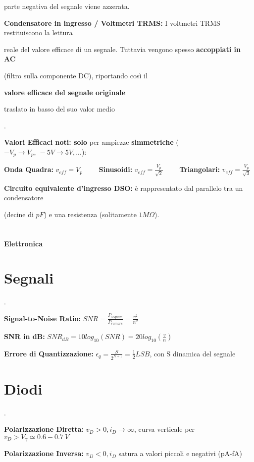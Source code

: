 \documentclass[12pt]{extarticle}
\begin{document}
parte negativa del segnale viene azzerata.
\newpage

{\bf Condensatore in ingresso / Voltmetri TRMS:} I voltmetri TRMS restituiscono la lettura

reale del valore efficace di un segnale. Tuttavia vengono spesso {\bf accoppiati in AC} 

(filtro sulla componente DC), riportando così il {\bf valore efficace del segnale originale

traslato in basso del suo valor medio}.

{\bf Valori Efficaci noti: solo} per ampiezze {\bf simmetriche} ($-V_p \to V_p, \ -5V \to 5V, ...$):

{\bf Onda Quadra:} $\displaystyle v_{eff} = V_p$ \ \ \ \ {\bf Sinusoidi:} $\displaystyle v_{eff} = \frac{V_p}{\sqrt{2}}$ \ \ \ \ {\bf Triangolari:} $\displaystyle v_{eff} = \frac{V_p}{\sqrt{3}}$


{\bf Circuito equivalente d'ingresso DSO:} è rappresentato dal parallelo tra un condensatore

(decine di $\displaystyle pF $) e una resistenza (solitamente $\displaystyle 1M\Omega $).
\\\\\\

{\bf \Huge Elettronica}
\setcounter{section}{0}
\section{Segnali}.



{\bf Signal-to-Noise Ratio:} $\displaystyle SNR = \frac{P_{segnale}}{P_{rumore}} = \frac{v^2}{n^2}$ 

{\bf SNR in dB:} $\displaystyle SNR_{dB} = 10log_{10}(SNR) = 20log_{10}(\frac{v}{n})$

{\bf Errore di Quantizzazione:} $\displaystyle \epsilon_q = \frac{S}{2^{N+1}} = \frac{1}{2}LSB $, con S dinamica del segnale

\section{Diodi}.

{\bf Polarizzazione Diretta:} $\displaystyle v_D > 0, i_D \to \infty $, curva verticale per $v_D > V_\gamma \simeq 0.6-0.7 \ V$

{\bf Polarizzazione Inversa:} $\displaystyle v_D < 0, i_D$ satura a valori piccoli e negativi (pA-fA)
\end{document}
